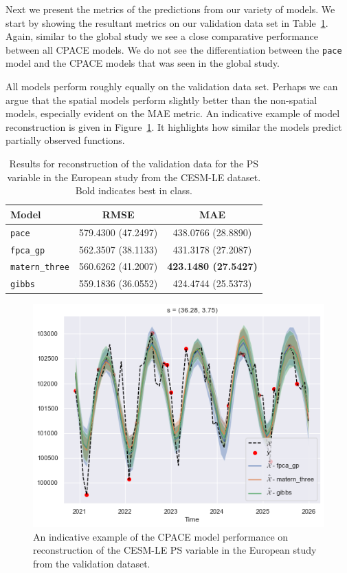 Next we present the metrics of the predictions from our variety of models.
We start by showing the resultant metrics on our validation data set in Table~\ref{tab:train_cesm_ps_eur}.
Again, similar to the global study we see a close comparative performance between all CPACE models.
We do not see the differentiation between the \verb*|pace| model and the CPACE models that was seen in the global study.

All models perform roughly equally on the validation data set.
Perhaps we can argue that the spatial models perform slightly better than the non-spatial models, especially evident on the MAE metric.
An indicative example of model reconstruction is given in Figure~\ref{fig:train_ex_ps_eur}.
It highlights how similar the models predict partially observed functions. 

\begin{table}
	\caption[Results for PS variable on validation data in the European study]{Results for reconstruction of the validation data for the PS variable in the European study from the CESM-LE dataset. Bold indicates best in class.}
	\centering
	\label{tab:train_cesm_ps_eur}
	\begin{tabular}{lcc}
		\toprule
		\textbf{Model} & \textbf{RMSE} & \textbf{MAE} \\
		\midrule
		\verb*|pace| & 579.4300 (47.2497) & 438.0766 (28.8890) \\
		\verb*|fpca_gp| & 562.3507 (38.1133) & 431.3178 (27.2087) \\
		\verb*|matern_three| & 560.6262 (41.2007)& \textbf{423.1480 (27.5427)}\\
		\verb*|gibbs| & 559.1836 (36.0552) & 424.4744 (25.5373)\\
		\bottomrule
	\end{tabular}
\end{table}

\begin{figure}
	\centering
	\includegraphics[width=\textwidth]{train_ex_ps_eur}
	\caption{An indicative example of the CPACE model performance on reconstruction of the CESM-LE PS variable in the European study from the validation dataset.}
	\label{fig:train_ex_ps_eur}
\end{figure}

